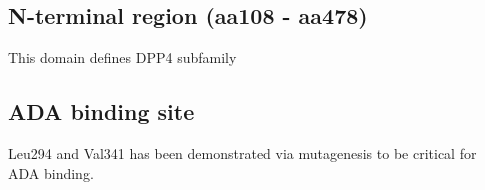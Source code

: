 \subsection{N-terminal region (aa108 - aa478)}

This domain defines DPP4 subfamily

\subsection{ADA binding site}
Leu294 and Val341 has been demonstrated via mutagenesis to be critical for ADA binding.~